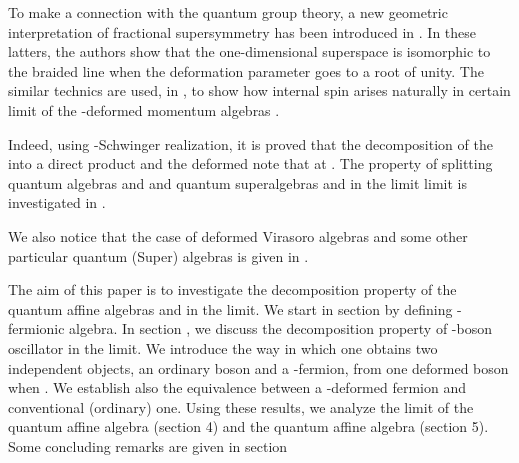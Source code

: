 \documentclass[a4paper,12pt,thmsa]{article}
\begin{document}
To make a connection with the quantum group theory, a new geometric
interpretation of fractional supersymmetry has been introduced in \myHighlight{$[13-17]$}\coordHE{}.
In these latters, the authors show that the one-dimensional superspace is
isomorphic to the braided line when the deformation parameter goes to a root
of unity. The similar technics are used, in \myHighlight{$[18]$}\coordHE{}, to show how internal
spin arises naturally in certain limit of the \coordHE{}-deformed momentum algebras
\coordHE{}.

Indeed, using \coordHE{}-Schwinger realization, it is proved that the decomposition
of the \coordHE{} into a direct product \coordHE{} and the deformed \coordHE{}  \myHighlight{$($}\coordHE{} note that \coordHE{}  \coordHE{} at \coordHE{} . The property
of splitting quantum algebras \coordHE{}  \coordHE{}  \coordHE{} and \coordHE{} and quantum
superalgebras \coordHE{}  \coordHE{}  \coordHE{} and \coordHE{} in the limit \coordHE{} limit is investigated in \myHighlight{$[19]$}\coordHE{}.

We also notice that the case of deformed Virasoro algebras and some other
particular quantum (Super) algebras is given in \myHighlight{$[20]$}\coordHE{}.

The aim of this paper is to investigate the decomposition property of the
quantum affine algebras \coordHE{} and \coordHE{} in the \coordHE{} limit. We start in section \coordHE{} by defining \coordHE{}-fermionic
algebra. In section \coordHE{}, we discuss the decomposition property of \coordHE{}-boson
oscillator in the \coordHE{} limit. We introduce the way in which one
obtains two independent objects, an ordinary boson and a \coordHE{}-fermion, from
one \coordHE{}deformed boson when \coordHE{}. We establish also the
equivalence between a \coordHE{}-deformed fermion and conventional (ordinary) one.
Using these results, we analyze the \coordHE{} limit of the quantum
affine algebra \coordHE{} (section 4) and the quantum affine algebra \coordHE{} (section 5). Some concluding remarks are given in
section \coordHE{}
\end{document}
